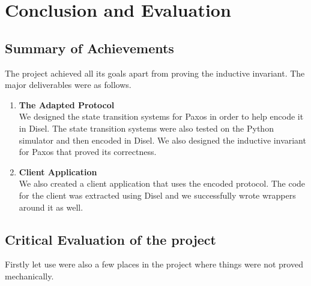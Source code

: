 \chapter{Conclusion and Evaluation}

\section{Summary of Achievements}
The project achieved all its goals apart from proving the inductive invariant.
The major deliverables were as follows.
\begin{enumerate}
  \item \textbf{The Adapted Protocol} \\
    We designed the state transition systems for Paxos in order to help encode it in
    Disel. The state transition systems were also tested on the Python simulator
    and then encoded in Disel. We also designed the inductive invariant for Paxos
    that proved its correctness.
  \item \textbf{Client Application} \\
    We also created a client application that uses the encoded protocol. The
    code for the client was extracted using Disel and we successfully wrote
    wrappers around it as well.
\end{enumerate}

\section{Critical Evaluation of the project}
Firstly let use were also a few places in the project where things
were not proved mechanically.

